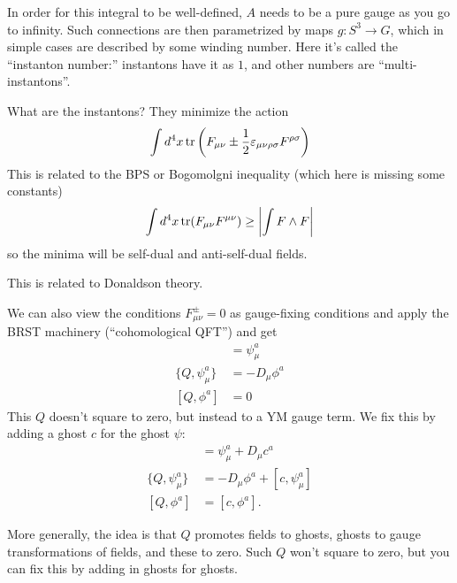 In order for this integral to be well-defined, $A$ needs to be a pure gauge as you go to infinity.
Such connections are then parametrized by  maps $g: S^3 \to G$, which in simple cases are described by some winding number.
Here it's called the ``instanton number:'' instantons have it as $1$, and other numbers are ``multi-instantons''.

What are the instantons?
They minimize the action
\[
\int d^4x \operatorname{tr}\left(F_{\mu \nu} \pm \frac{1}{2} \varepsilon_{\mu \nu \rho \sigma} F^{\rho \sigma}\right)
\]
This is related to the BPS or Bogomolgni inequality (which here is missing some constants)
\[
\int d^4x \operatorname{tr}(F_{\mu \nu} F^{\mu \nu}) \ge \left| \int F \wedge F \right|
\]
so the minima will be self-dual and anti-self-dual fields.

This is related to Donaldson theory.

We can also view the conditions $F_{\mu \nu}^\pm = 0$ as gauge-fixing conditions and apply the BRST machinery (``cohomological QFT'') and get
\begin{align*}
[Q, A_\mu^A] &= \psi_\mu^a\\
\{Q, \psi_\mu^a\} &= -D_\mu \phi^a\\
[Q, \phi^a] &= 0
\end{align*}
This $Q$ doesn't square to zero, but instead to a YM gauge term.
We fix this by adding a ghost $c$ for the ghost $\psi$:
\begin{align*}
[Q,A_\mu^a] &= \psi_\mu^a + D_\mu c^a\\
\{Q,\psi_\mu^a\} &= -D_\mu \phi^a + [c, \psi_\mu^a]\\
[Q, \phi^a] &= [c,\phi^a].
\end{align*}

More generally, the idea is that $Q$ promotes fields to ghosts, ghosts to gauge transformations of fields, and these to zero.
Such $Q$ won't square to zero, but you can fix this by adding in ghosts for ghosts.
